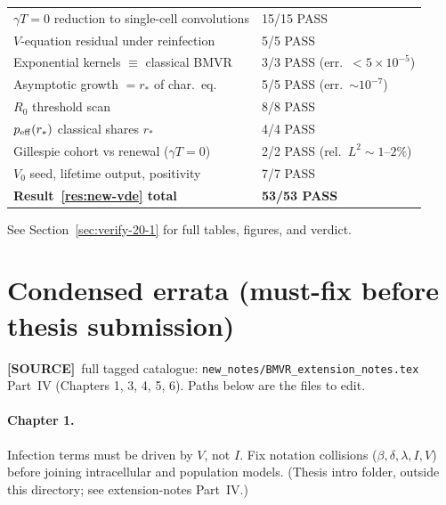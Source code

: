 \documentclass[11pt,a4paper]{article}
\theoremstyle{plain}
\theoremstyle{definition}
\theoremstyle{remark}
\newcommand{\SOURCE}{\textcolor{gray!50!black}{\textbf{[SOURCE]}}}
\begin{document}
\begin{center}
\begin{tabular}{@{}ll@{}}
$\gamma T=0$ reduction to single-cell convolutions & 15/15 PASS \\
$V$-equation residual under reinfection & 5/5 PASS \\
Exponential kernels $\equiv$ classical BMVR & 3/3 PASS (err.\ $<5\times 10^{-5}$) \\
Asymptotic growth $=r_*$ of char.\ eq. & 5/5 PASS (err.\ $\sim 10^{-7}$) \\
$R_0$ threshold scan & 8/8 PASS \\
$p_{\rm eff}(r_*)$ classical shares $r_*$ & 4/4 PASS \\
Gillespie cohort vs renewal ($\gamma T=0$) & 2/2 PASS (rel.\ $L^2\sim 1$--$2\%$) \\
$V_0$ seed, lifetime output, positivity & 7/7 PASS \\
\textbf{Result~\ref{res:new-vde} total} & \textbf{53/53 PASS} \\
\bottomrule
\end{tabular}
\end{center}

See Section~\ref{sec:verify-20-1} for full tables, figures, and verdict.

\section{Condensed errata (must-fix before thesis submission)}
\label{sec:errata}
\SOURCE\
full tagged catalogue:
\texttt{new\_notes/BMVR\_extension\_notes.tex} Part~IV
(Chapters 1, 3, 4, 5, 6). Paths below are the files to edit.

\paragraph{Chapter 1.}
Infection terms must be driven by $V$, not $I$. Fix notation collisions
($\beta,\delta,\lambda,I,V$) before joining intracellular and population models.
(Thesis intro folder, outside this directory; see extension-notes Part~IV.)
\end{document}
